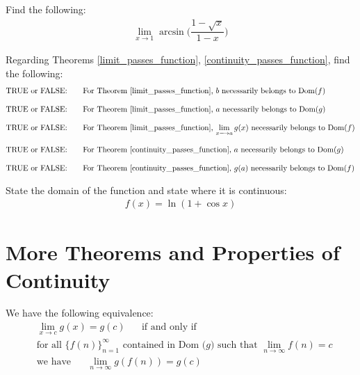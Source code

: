 \begin{exercise}
Find the following:
\begin{align*}
    \lim_{x \longrightarrow 1} \arcsin \Big( \dfrac{1 - \sqrt{x}}{1 - x} \Big)
\end{align*}
\end{exercise}

\begin{exercise}
Regarding Theorems \ref{limit_passes_function}, \ref{continuity_passes_function}, find the following:
\begin{align*}
    &\text{TRUE or FALSE:} \hspace{20pt} \text{For Theorem \ref{limit_passes_function}, $b$ necessarily belongs to Dom($f$)}\\[2ex]
    &\text{TRUE or FALSE:} \hspace{20pt} \text{For Theorem \ref{limit_passes_function}, $a$ necessarily belongs to Dom($g$)}\\[2ex]
    &\text{TRUE or FALSE:} \hspace{20pt} \text{For Theorem \ref{limit_passes_function}, $\lim_{x \longrightarrow a} g(x)$ necessarily belongs to Dom($f$)}\\[2ex]
    &\text{TRUE or FALSE:} \hspace{20pt} \text{For Theorem \ref{continuity_passes_function}, $a$ necessarily belongs to Dom($g$)}\\[2ex]
    &\text{TRUE or FALSE:} \hspace{20pt} \text{For Theorem \ref{continuity_passes_function}, $g(a)$ necessarily belongs to Dom($f$)}
\end{align*}
\end{exercise}

\begin{exercise}
State the domain of the function and state where it is continuous:
\begin{align*}
    f(x) = \ln (1 + \cos x)
\end{align*}
\end{exercise}

\newpage
\section{More Theorems and Properties of Continuity}

\begin{theorem}
We have the following equivalence:
\begin{align*}
    &\lim_{x \longrightarrow c} g(x) = g(c) \hspace{20pt} \text{if and only if}\\[2ex]
    &\text{for all} \hspace{4pt} \{f(n)\}_{n=1}^{\infty} \hspace{4pt} \text{contained in Dom ($g$) such that} \hspace{4pt} \lim_{n \longrightarrow \infty} f(n)=c\\[2ex]
    &\text{we have} \hspace{20pt} \lim_{n \longrightarrow \infty} g(f(n)) = g(c)
\end{align*}
\label{sequential_criterion_for_continuity}
\end{theorem}


